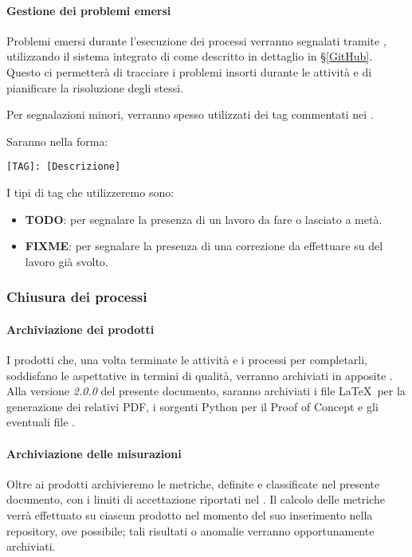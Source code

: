     		\paragraph{Gestione dei problemi emersi}
			Problemi emersi durante l'esecuzione dei processi verranno segnalati tramite , utilizzando il sistema integrato di
			 come descritto in dettaglio in \S\ref{GitHub}. Questo ci permetterà di tracciare i problemi insorti durante le attività
			e di pianificare la risoluzione degli stessi.\par
			Per segnalazioni minori, verranno spesso utilizzati dei tag commentati nei .
			\begin{samepage}
				Saranno nella forma:
				\begin{center}
					\texttt{[TAG]: [Descrizione]}
				\end{center}
			\end{samepage}
			I tipi di tag che utilizzeremo sono:
			\begin{itemize}
				\item \textbf{TODO}: per segnalare la presenza di un lavoro da fare o lasciato a metà.
				\item \textbf{FIXME}: per segnalare la presenza di una correzione da effettuare su del lavoro già svolto.
			\end{itemize}


		\subsubsection{Chiusura dei processi}

    		\paragraph{Archiviazione dei prodotti}
			I prodotti che, una volta terminate le attività e i processi per completarli, soddisfano le aspettative in termini di qualità,
			verranno archiviati in apposite . Alla versione \textit{2.0.0} del presente documento, saranno archiviati
			i file \LaTeX\ per la generazione dei relativi PDF, i sorgenti Python per il Proof of Concept e gli eventuali file .

    		\paragraph{Archiviazione delle misurazioni}
			Oltre ai prodotti archivieremo le metriche, definite e classificate nel presente documento, con i limiti di accettazione riportati nel \Doc{\PdQv}.
			Il calcolo delle metriche verrà effettuato su ciascun prodotto nel momento del suo inserimento nella repository, ove possibile; tali risultati
			o anomalie verranno opportunamente archiviati. %


